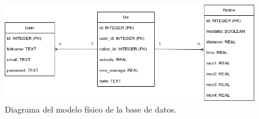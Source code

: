 \begin{figure}[ht]
    \centering
    \includegraphics[scale=0.6]{images/logic-model-db.png}
    \caption{Diagrama del modelo físico de la base de datos.}
    \label{fig: logic-model-db}
\end{figure} 